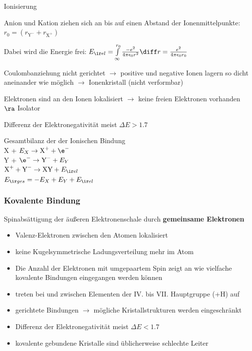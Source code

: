 \begin{sectionbox}
    \begin{cookbox}{Ionisierung}
        \item Anion und Kation ziehen sich an bis auf einen Abstand der Ionenmittelpunkte: $r_0=(r_{\text{Y}^-}+r_{\text{X}^+})$
        \item Dabei wird die Energie frei: $E_{\ir el}= \int\limits_\infty^{r_0} \frac{-e^2}{4\pi\epsilon_0r^2 }\diff r= \frac{e^2}{4\pi\epsilon_0r_0}$
        \item Coulombanziehung nicht gerichtet $\rightarrow$ positive und negative Ionen lagern so dicht aneinander wie möglich $\rightarrow$ Ionenkristall (nicht verformbar)
        \item Elektronen sind an den Ionen lokalisiert $\rightarrow$ keine freien Elektronen vorhanden $\ra $ Isolator
        \item Differenz der Elektronegativität meist $\Delta E>1.7$
        \item Gesamtbilanz der der Ionischen Bindung\\
        X + $E_X \rightarrow \text X^+ + \e^-$\\
        Y + $\e^- \rightarrow \text Y^- + E_Y$\\
        $\text X^+ + \text Y^- \rightarrow \text{XY} + E_{\ir el}$\\
        $E_{\ir ges} = -E_X + E_Y + E_{\ir el}$\\
    \end{cookbox}

    \subsubsection{Kovalente Bindung}
    Spinabsättigung der äußeren Elektronenschale durch \textbf{gemeinsame Elektronen}

    \begin{itemize}
        \item Valenz-Elektronen zwischen den Atomen lokalisiert
        \item keine Kugelsymmetrische Ladungsverteilung mehr im Atom
        \item Die Anzahl der Elektronen mit umgepaartem Spin zeigt an wie vielfache kovalente Bindungen eingegangen werden können
        \item treten bei und zwischen Elementen der IV. bis VII. Hauptgruppe (+H) auf
        \item gerichtete Bindungen $\rightarrow$ mögliche Kristallstrukturen werden eingeschränkt
        \item Differenz der Elektronegativität meist $\Delta E<1.7$
        \item kovalente gebundene Kristalle sind üblicherweise schlechte Leiter
    \end{itemize}



\end{sectionbox}
